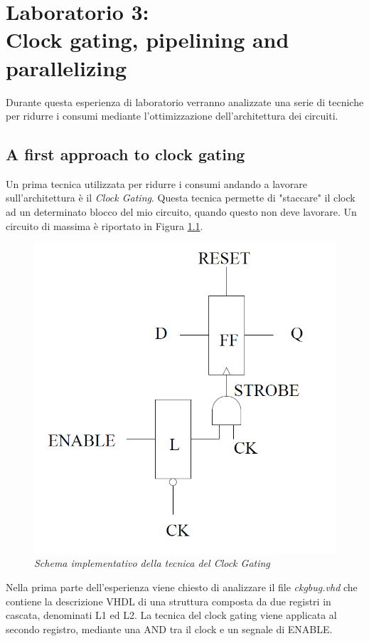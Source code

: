 \chapter{Laboratorio 3: \\Clock gating, pipelining and parallelizing}
Durante questa esperienza di laboratorio verranno analizzate una serie di tecniche per ridurre i consumi mediante l'ottimizzazione dell'architettura dei circuiti.
\section{A first approach to clock gating}
Un prima tecnica utilizzata per ridurre i consumi andando a lavorare sull'architettura è il \textit{Clock Gating}. Questa tecnica permette di "staccare" il clock ad un determinato blocco del mio circuito, quando questo non deve lavorare. Un circuito di massima è riportato in Figura \ref{clock_gating}. \\
\begin{figure}[!htb]
	\centering
	\includegraphics[scale=0.60]{immagini/clock_gating}
	\caption{\textit{Schema implementativo della tecnica del Clock Gating}}
	\label{clock_gating}
\end{figure}
\newpage
\noindent Nella prima parte dell'esperienza viene chiesto di analizzare il file \textit{ckgbug.vhd} che contiene la descrizione VHDL di una struttura composta da due registri in cascata, denominati L1 ed L2. La tecnica del clock gating viene applicata al secondo registro, mediante una AND tra il clock e un segnale di ENABLE. \\
